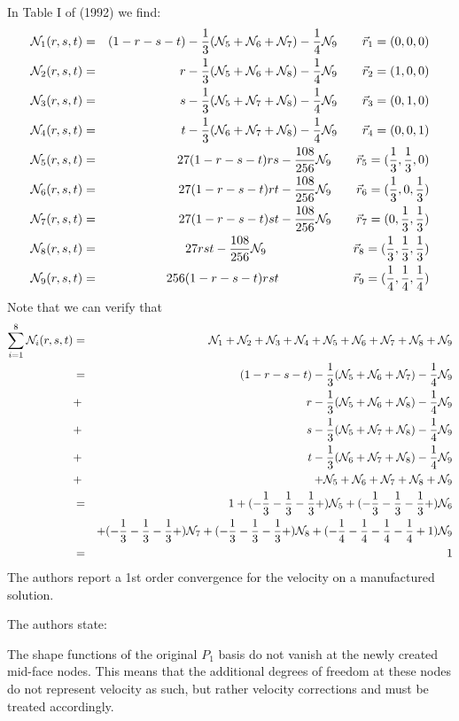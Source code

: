 In Table I of \textcite{begt92} (1992) we find:
\begin{eqnarray}
{\mathcal{N}}_1(r,s,t) &=& (1-r-s-t)-\frac13 ({\mathcal{N}}_5+{\mathcal{N}}_6+{\mathcal{N}}_7)-\frac14 {\mathcal{N}}_9 \qquad \vec{r}_1=(0,0,0) \nonumber\\
{\mathcal{N}}_2(r,s,t) &=& r-\frac13 ({\mathcal{N}}_5+{\mathcal{N}}_6+{\mathcal{N}}_8)-\frac14 {\mathcal{N}}_9 \qquad \vec{r}_2=(1,0,0) \nonumber\\
{\mathcal{N}}_3(r,s,t) &=& s-\frac13 ({\mathcal{N}}_5+{\mathcal{N}}_7+{\mathcal{N}}_8)-\frac14 {\mathcal{N}}_9 \qquad \vec{r}_3=(0,1,0) \nonumber\\
{\mathcal{N}}_4(r,s,t) &=& t-\frac13 ({\mathcal{N}}_6+{\mathcal{N}}_7+{\mathcal{N}}_8)-\frac14 {\mathcal{N}}_9 \qquad \vec{r}_4=(0,0,1) \nonumber\\
{\mathcal{N}}_5(r,s,t) &=& 27(1-r-s-t)rs-\frac{108}{256}{\mathcal{N}}_9          \qquad \vec{r}_5=(\frac13,\frac13,0) \nonumber\\
{\mathcal{N}}_6(r,s,t) &=& 27(1-r-s-t)rt-\frac{108}{256}{\mathcal{N}}_9          \qquad \vec{r}_6=(\frac13,0,\frac13) \nonumber\\
{\mathcal{N}}_7(r,s,t) &=& 27(1-r-s-t)st-\frac{108}{256}{\mathcal{N}}_9          \qquad \vec{r}_7=(0,\frac13,\frac13) \nonumber\\
{\mathcal{N}}_8(r,s,t) &=& 27rst-\frac{108}{256}{\mathcal{N}}_9  \qquad\qquad\qquad\quad \vec{r}_8=(\frac13,\frac13,\frac13)\nonumber\\ 
{\mathcal{N}}_9(r,s,t) &=& 256(1-r-s-t)rst \qquad\qquad\qquad \vec{r}_9=(\frac14,\frac14,\frac14)\nonumber
\end{eqnarray}
Note that we can verify that
\begin{eqnarray}
\sum_{i=1}^8 {\mathcal{N}}_i(r,s,t) 
&=& {\mathcal{N}}_1 +{\mathcal{N}}_2 +{\mathcal{N}}_3 +{\mathcal{N}}_4 +{\mathcal{N}}_5 +{\mathcal{N}}_6 +{\mathcal{N}}_7 +{\mathcal{N}}_8 +{\mathcal{N}}_9\nonumber\\
&=& (1-r-s-t)-\frac13 ({\mathcal{N}}_5+{\mathcal{N}}_6+{\mathcal{N}}_7)-\frac14 {\mathcal{N}}_9 \nonumber\\
&+& r-\frac13 ({\mathcal{N}}_5+{\mathcal{N}}_6+{\mathcal{N}}_8)-\frac14 {\mathcal{N}}_9 \nonumber\\
&+& s-\frac13 ({\mathcal{N}}_5+{\mathcal{N}}_7+{\mathcal{N}}_8)-\frac14 {\mathcal{N}}_9 \nonumber\\
&+& t-\frac13 ({\mathcal{N}}_6+{\mathcal{N}}_7+{\mathcal{N}}_8)-\frac14 {\mathcal{N}}_9 \nonumber\\
&+& +{\mathcal{N}}_5 +{\mathcal{N}}_6 +{\mathcal{N}}_7 +{\mathcal{N}}_8 +{\mathcal{N}}_9 \nonumber\\
&=& 1 
+ (-\frac13-\frac13-\frac13 + )  {\mathcal{N}}_5
+ (-\frac13-\frac13-\frac13 + )  {\mathcal{N}}_6 \nonumber\\
&& + (-\frac13-\frac13-\frac13 + )  {\mathcal{N}}_7
+ (-\frac13-\frac13-\frac13 + )  {\mathcal{N}}_8 
+ (-\frac14 -\frac14-\frac14 -\frac14 +1) {\mathcal{N}}_9 \nonumber\\
&=& 1
\end{eqnarray}
The authors report a 1st order convergence for the velocity on a manufactured solution.

The authors state:
\begin{displayquote}
{\color{darkgray}
The shape functions of the original $P_1$ basis do not vanish at the newly created mid-face nodes.
This means that the additional degrees of freedom at these nodes do not represent velocity as
such, but rather velocity corrections and must be treated accordingly.
}
\end{displayquote}


